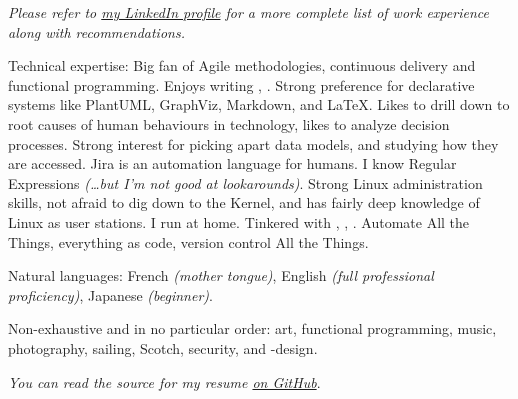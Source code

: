 \documentclass[10pt,letterpaper]{article}
\begin{document}
\begin{center}
  \emph{\small Please refer to \href{https://www.linkedin.com/in/alexis-vanier-94705463/}{my LinkedIn profile} for a more complete list of work experience along with recommendations.}
\end{center}


\spacedhrule{-0.2em}{-0.4em}


\inlineheadsection  %
  {Technical expertise:}
  {Big fan of Agile methodologies, continuous delivery and functional programming. Enjoys writing , . Strong preference for declarative systems like PlantUML, GraphViz, Markdown, and \LaTeX. Likes to drill down to root causes of human behaviours in technology, likes to analyze decision processes. Strong interest for picking apart data models, and studying how they are accessed. Jira is an automation language for humans. I know Regular Expressions \emph{\small{(\ldots but I'm not good at lookarounds)}}. Strong Linux administration skills, not afraid to dig down to the Kernel, and has fairly deep knowledge of Linux as user stations. I run  at home. Tinkered with , , . Automate All the Things, everything as code, version control All the Things.}

\vspace{0.5em}
\inlineheadsection
  {Natural languages:}
  {French \emph{(mother tongue)}, English \emph{(full professional proficiency)}, Japanese \emph{(beginner)}.}


\spacedhrule{1.6em}{-0.4em}


\inlineheadsection
  {Non-exhaustive and in no particular order:}
  {art, functional programming, music, photography, sailing, Scotch, security, and -design.}

\vspace{1em}
\begin{center}
  \emph{\small You can read the source for my resume \href{https://www.github.com/avanier}{on GitHub}}.
\end{center}
\end{document}
